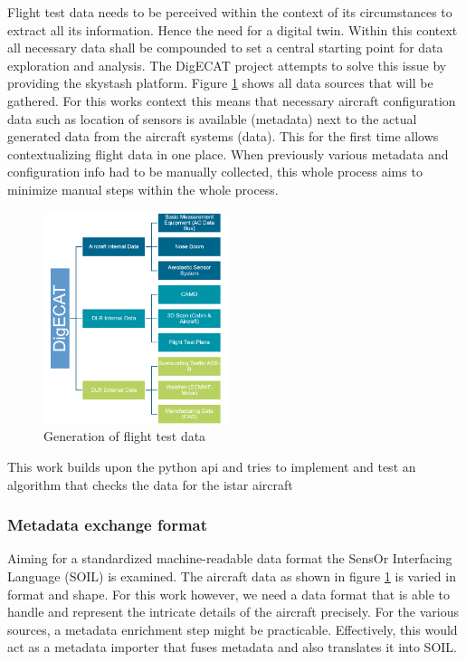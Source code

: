 Flight test data needs to be perceived within the context of its circumstances to extract all its information. Hence the need for a digital twin. Within this context all necessary data shall be compounded to set a central starting point for data exploration and analysis. The DigECAT project attempts to solve this issue by providing the skystash platform. Figure \ref{fig:digecat_data_sources} shows all data sources that will be gathered. For this works context this means that necessary aircraft configuration data such as location of sensors is available (metadata) next to the actual generated data from the aircraft systems (data). This for the first time allows contextualizing flight data in one place. When previously various metadata and configuration info had to be manually collected, this whole process aims to minimize manual steps within the whole process.

\cite{arts_digital_2022}

\begin{figure}
    \centering
    \includegraphics[width=0.48\textwidth]{03_figures/DIGECAT}
    \caption{Generation of flight test data \cite{arts_digital_2022} }
    \label{fig:digecat_data_sources}
\end{figure}
This work builds upon the python api and tries to implement and test an algorithm that checks the data for the istar aircraft
\cite{meyer_development_2020}

\subsubsection{Metadata exchange format}
\label{chap:2-metadata-format}

Aiming for a standardized machine-readable data format the SensOr Interfacing Language (SOIL) is examined. The aircraft data as shown in figure \ref{fig:digecat_data_sources} is varied in format and shape. For this work however, we need a data format that is able to handle and represent the intricate details of the aircraft precisely. For the various sources, a metadata enrichment step might be practicable. Effectively, this would act as a metadata importer that fuses metadata and also translates it into SOIL.

